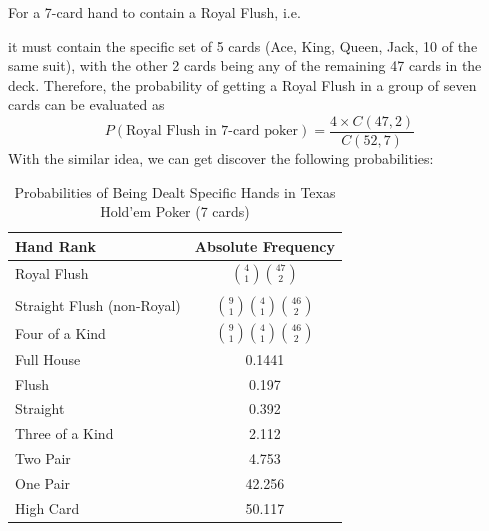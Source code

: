 \documentclass{article}
\begin{document}
For a 7-card hand to contain a Royal Flush, i.e.
\begin{center}
\end{center}
it must contain the specific set of 5 cards 
(Ace, King, Queen, Jack, 10 of the same suit), 
with the other 2 cards being any of the remaining 47 cards in the deck. 
Therefore, the probability of getting a Royal Flush in a group of seven 
cards can be evaluated as 
\[
P(\text{Royal Flush in 7-card poker}) = \frac{4 \times C(47, 2)}{C(52, 7)}
\]
With the similar idea, we can get discover the following probabilities:
\begin{table}[ht]
    \centering
    \caption{Probabilities of Being Dealt Specific Hands in Texas Hold'em Poker (7 cards)}
    \label{tab:poker_hands}
    \begin{tabularx}{\textwidth}{@{}Xc@{}} %
    \toprule
    Hand Rank                  & Absolute Frequency \\ \midrule
    Royal Flush                & $\displaystyle \binom{4}{1} \binom{47}{2}$       \\
    \\
    Straight Flush (non-Royal) & $\displaystyle \binom{9}{1} \binom{4}{1} \binom{46}{2}$          \\
    Four of a Kind             & $\displaystyle \binom{9}{1} \binom{4}{1} \binom{46}{2}$           \\
    Full House                 & 0.1441           \\
    Flush                      & 0.197            \\
    Straight                   & 0.392            \\
    Three of a Kind            & 2.112            \\
    Two Pair                   & 4.753            \\
    One Pair                   & 42.256           \\
    High Card                  & 50.117           \\ \bottomrule
    \end{tabularx}
\end{table}
\end{document}
